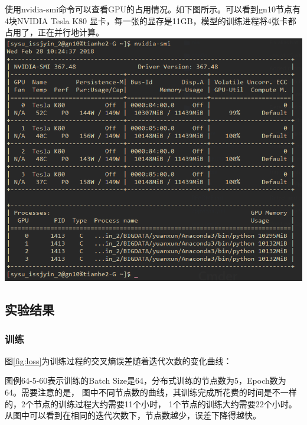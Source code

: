 使用nvidia-smi命令可以查看GPU的占用情况。如下图所示。可以看到gn10节点有4块NVIDIA Tesla K80
显卡，每一张的显存是11GB，模型的训练进程将4张卡都占用了，正在并行地计算。\\[0.5cm]
\includegraphics[width=1\textwidth]{figure/smi}
\subsection{实验结果}
\subsubsection{训练}
图\ref{fig:loss}为训练过程的交叉熵误差随着迭代次数的变化曲线：

图例64-5-60表示训练的Batch Size是64，分布式训练的节点数为5，Epoch数为64。需要注意的是，
图中不同节点数的曲线，其训练完成所花费的时间是不一样的，2个节点的训练过程大约需要11个小时，
1个节点的训练大约需要22个小时。从图中可以看到在相同的迭代次数下，节点数越少，误差下降得越快。

